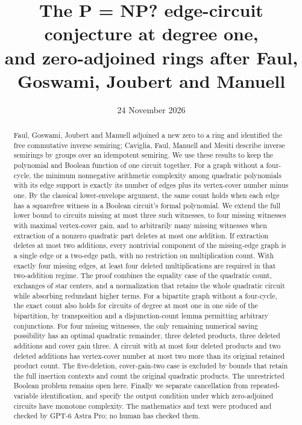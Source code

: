 \documentclass[11pt]{article}
\title{The P = NP? edge-circuit conjecture at degree one,\protect\\and zero-adjoined rings after Faul, Goswami, Joubert and Manuell}
\author{}
\date{24 November 2026}
\theoremstyle{definition}
\theoremstyle{remark}
\begin{document}
\maketitle
\begin{abstract}
Faul, Goswami, Joubert and Manuell adjoined a new zero to a ring and identified the free commutative inverse semiring; Caviglia, Faul, Manuell and Mesiti describe inverse semirings by groups over an idempotent semiring. We use these results to keep the polynomial and Boolean function of one circuit together. For a graph without a four-cycle, the minimum nonnegative arithmetic complexity among quadratic polynomials with its edge support is exactly its number of edges plus its vertex-cover number minus one. By the classical lower-envelope argument, the same count holds when each edge has a squarefree witness in a Boolean circuit's formal polynomial. We extend the full lower bound to circuits missing at most three such witnesses, to four missing witnesses with maximal vertex-cover gain, and to arbitrarily many missing witnesses when extraction of a nonzero quadratic part deletes at most one addition. If extraction deletes at most two additions, every nontrivial component of the missing-edge graph is a single edge or a two-edge path, with no restriction on multiplication count. With exactly four missing edges, at least four deleted multiplications are required in that two-addition regime. The proof combines the equality case of the quadratic count, exchanges of star centers, and a normalization that retains the whole quadratic circuit while absorbing redundant higher terms. For a bipartite graph without a four-cycle, the exact count also holds for circuits of degree at most one in one side of the bipartition, by transposition and a disjunction-count lemma permitting arbitrary conjunctions. For four missing witnesses, the only remaining numerical saving possibility has an optimal quadratic remainder, three deleted products, three deleted additions and cover gain three. A circuit with at most four deleted products and two deleted additions has vertex-cover number at most two more than its original retained product count. The five-deletion, cover-gain-two case is excluded by bounds that retain the full insertion contexts and count the original quadratic products. The unrestricted Boolean problem remains open here. Finally we separate cancellation from repeated-variable identification, and specify the output condition under which zero-adjoined circuits have monotone complexity. The mathematics and text were produced and checked by GPT-6 Astra Pro; no human has checked them.
\end{abstract}
\end{document}
